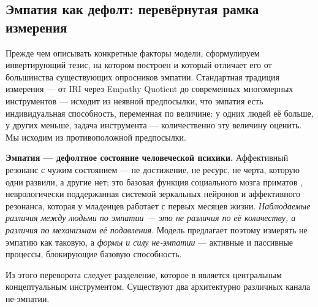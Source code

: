 \subsection{Эмпатия как дефолт: перевёрнутая рамка измерения}
\label{subsec:empathy_as_default}

Прежде чем описывать конкретные факторы модели, сформулируем инвертирующий тезис, на котором \DEIC{} построен и который отличает его от большинства существующих опросников эмпатии. Стандартная традиция измерения --- от IRI \citep[Interpersonal Reactivity Index;][]{davis1983} через Empathy Quotient \citep{baroncohen2011} до современных многомерных инструментов --- исходит из неявной предпосылки, что эмпатия есть индивидуальная способность, переменная по величине: у одних людей её больше, у других меньше, задача инструмента --- количественно эту величину оценить. Мы исходим из противоположной предпосылки.

\textbf{Эмпатия --- дефолтное состояние человеческой психики.} Аффективный резонанс с чужим состоянием --- не достижение, не ресурс, не черта, которую одни развили, а другие нет; это базовая функция социального мозга приматов \citep{rizzolatti2004, iacoboni2009, decety2011}, неврологически поддержанная системой зеркальных нейронов и аффективного резонанса, которая у младенцев работает с первых месяцев жизни. \emph{Наблюдаемые различия между людьми по эмпатии --- это не различия по её количеству, а различия по механизмам её подавления.} Модель предлагает поэтому измерять не эмпатию как таковую, а \emph{формы и силу не-эмпатии} --- активные и пассивные процессы, блокирующие базовую способность.

Из этого переворота следует разделение, которое в \DEIC{} является центральным концептуальным инструментом. Существуют два архитектурно различных канала не-эмпатии.


